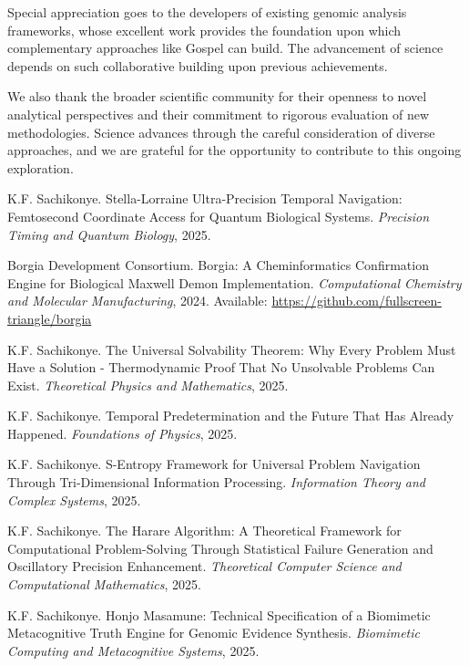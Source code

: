\documentclass[12pt,a4paper]{article}
\begin{document}
Special appreciation goes to the developers of existing genomic analysis frameworks, whose excellent work provides the foundation upon which complementary approaches like Gospel can build. The advancement of science depends on such collaborative building upon previous achievements.

We also thank the broader scientific community for their openness to novel analytical perspectives and their commitment to rigorous evaluation of new methodologies. Science advances through the careful consideration of diverse approaches, and we are grateful for the opportunity to contribute to this ongoing exploration.

\begin{thebibliography}{99}

K.F. Sachikonye.
\newblock Stella-Lorraine Ultra-Precision Temporal Navigation: Femtosecond Coordinate Access for Quantum Biological Systems.
\newblock \textit{Precision Timing and Quantum Biology}, 2025.

Borgia Development Consortium.
\newblock Borgia: A Cheminformatics Confirmation Engine for Biological Maxwell Demon Implementation.
\newblock \textit{Computational Chemistry and Molecular Manufacturing}, 2024.
\newblock Available: \url{https://github.com/fullscreen-triangle/borgia}

K.F. Sachikonye.
\newblock The Universal Solvability Theorem: Why Every Problem Must Have a Solution - Thermodynamic Proof That No Unsolvable Problems Can Exist.
\newblock \textit{Theoretical Physics and Mathematics}, 2025.

K.F. Sachikonye.
\newblock Temporal Predetermination and the Future That Has Already Happened.
\newblock \textit{Foundations of Physics}, 2025.

K.F. Sachikonye.
\newblock S-Entropy Framework for Universal Problem Navigation Through Tri-Dimensional Information Processing.
\newblock \textit{Information Theory and Complex Systems}, 2025.

K.F. Sachikonye.
\newblock The Harare Algorithm: A Theoretical Framework for Computational Problem-Solving Through Statistical Failure Generation and Oscillatory Precision Enhancement.
\newblock \textit{Theoretical Computer Science and Computational Mathematics}, 2025.

K.F. Sachikonye.
\newblock Honjo Masamune: Technical Specification of a Biomimetic Metacognitive Truth Engine for Genomic Evidence Synthesis.
\newblock \textit{Biomimetic Computing and Metacognitive Systems}, 2025.


\end{thebibliography}
\end{document}
